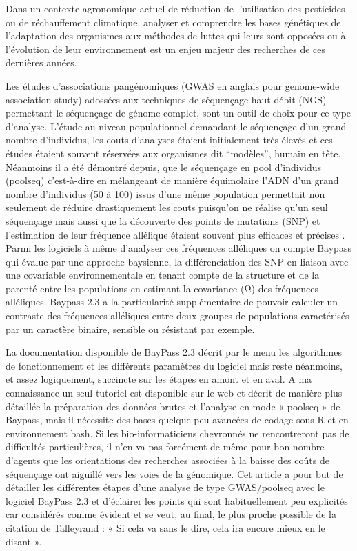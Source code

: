 \documentclass[
  openany]{book}
\theoremstyle{definition}
\theoremstyle{definition}
\theoremstyle{definition}
\theoremstyle{definition}
\theoremstyle{remark}
\begin{document}
Dans un contexte agronomique actuel de réduction de l'utilisation des pesticides ou de réchauffement climatique, analyser et comprendre les bases génétiques de l'adaptation des organismes aux méthodes de luttes qui leurs sont opposées ou à l'évolution de leur environnement est un enjeu majeur des recherches de ces dernières années.

Les études d'associations pangénomiques (GWAS en anglais pour genome-wide association study) adossées aux techniques de séquençage haut débit (NGS) permettant le séquençage de génome complet, sont un outil de choix pour ce type d'analyse. L'étude au niveau populationnel demandant le séquençage d'un grand nombre d'individus, les couts d'analyses étaient initialement très élevés et ces études étaient souvent réservées aux organismes dit ``modèles'', humain en tête. Néanmoins il a été démontré depuis, que le séquençage en pool d'individus (poolseq) c'est-à-dire en mélangeant de manière équimolaire l'ADN d'un grand nombre d'individus (50 à 100) issus d'une même population permettait non seulement de réduire drastiquement les couts puisqu'on ne réalise qu'un seul séquençage mais aussi que la découverte des points de mutations (SNP) et l'estimation de leur fréquence allélique étaient souvent plus efficaces et précises \citep{futschik_next_2010}. Parmi les logiciels à même d'analyser ces fréquences alléliques on compte Baypass \citep{gautier_genome-wide_2015} qui évalue par une approche baysienne, la différenciation des SNP en liaison avec une covariable environnementale en tenant compte de la structure et de la parenté entre les populations en estimant la covariance (Ω) des fréquences alléliques. Baypass 2.3 a la particularité supplémentaire de pouvoir calculer un contraste des fréquences alléliques entre deux groupes de populations caractérisés par un caractère binaire, sensible ou résistant par exemple.

La documentation disponible de BayPass 2.3 décrit par le menu les algorithmes de fonctionnement et les différents paramètres du logiciel mais reste néanmoins, et assez logiquement, succincte sur les étapes en amont et en aval. A ma connaissance un seul tutoriel est disponible sur le web \citep{nielsen_pool-seq_2020} et décrit de manière plus détaillée la préparation des données brutes et l'analyse en mode « poolseq » de Baypass, mais il nécessite des bases quelque peu avancées de codage sous R et en environnement bash. Si les bio-informaticiens chevronnés ne rencontreront pas de difficultés particulières, il n'en va pas forcément de même pour bon nombre d'agents que les orientations des recherches associées à la baisse des coûts de séquençage ont aiguillé vers les voies de la génomique. Cet article a pour but de détailler les différentes étapes d'une analyse de type GWAS/poolseq avec le logiciel BayPass 2.3 et d'éclairer les points qui sont habituellement peu explicités car considérés comme évident et se veut, au final, le plus proche possible de la citation de Talleyrand : « Si cela va sans le dire, cela ira encore mieux en le disant ».
\end{document}
